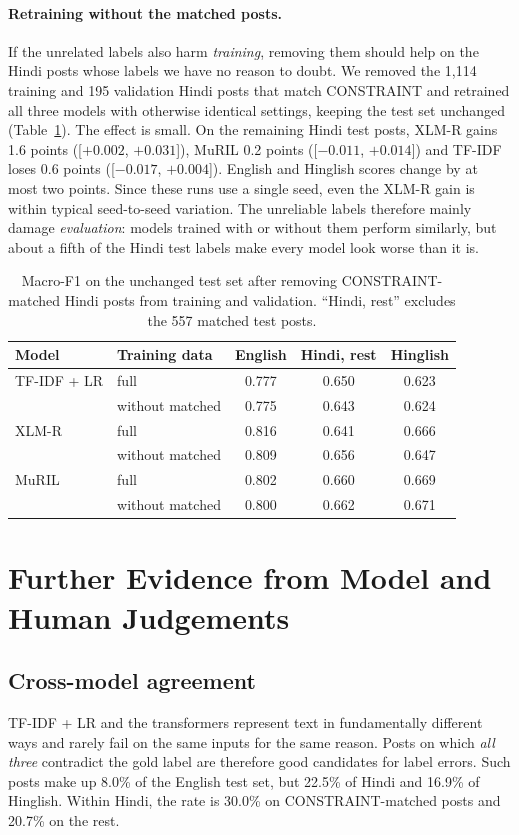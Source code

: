 \documentclass[11pt,a4paper]{article}
\begin{document}
\paragraph{Retraining without the matched posts.}
If the unrelated labels also harm \emph{training}, removing them should help on the Hindi posts whose labels we have no reason to doubt.
We removed the 1,114 training and 195 validation Hindi posts that match CONSTRAINT and retrained all three models with otherwise identical settings, keeping the test set unchanged (Table~\ref{tab:clean}).
The effect is small.
On the remaining Hindi test posts, XLM-R gains 1.6 points ([$+0.002$, $+0.031$]), MuRIL 0.2 points ([$-0.011$, $+0.014$]) and TF-IDF loses 0.6 points ([$-0.017$, $+0.004$]). English and Hinglish scores change by at most two points.
Since these runs use a single seed, even the XLM-R gain is within typical seed-to-seed variation.
The unreliable labels therefore mainly damage \emph{evaluation}: models trained with or without them perform similarly, but about a fifth of the Hindi test labels make every model look worse than it is.

\begin{table}[h]
\centering
\small
\begin{tabular}{llccc}
\toprule
Model & Training data & English & Hindi, rest & Hinglish \\
\midrule
TF-IDF + LR & full & 0.777 & 0.650 & 0.623 \\
 & without matched & 0.775 & 0.643 & 0.624 \\
XLM-R & full & 0.816 & 0.641 & 0.666 \\
 & without matched & 0.809 & 0.656 & 0.647 \\
MuRIL & full & 0.802 & 0.660 & 0.669 \\
 & without matched & 0.800 & 0.662 & 0.671 \\
\bottomrule
\end{tabular}
\caption{Macro-F1 on the unchanged test set after removing CONSTRAINT-matched Hindi posts from training and validation. ``Hindi, rest'' excludes the 557 matched test posts.}
\label{tab:clean}
\end{table}

\section{Further Evidence from Model and Human Judgements}
\label{sec:labels}

\subsection{Cross-model agreement}
TF-IDF + LR and the transformers represent text in fundamentally different ways and rarely fail on the same inputs for the same reason.
Posts on which \emph{all three} contradict the gold label are therefore good candidates for label errors.
Such posts make up 8.0\% of the English test set, but 22.5\% of Hindi and 16.9\% of Hinglish.
Within Hindi, the rate is 30.0\% on CONSTRAINT-matched posts and 20.7\% on the rest.
\end{document}
